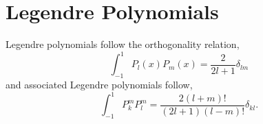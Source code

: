 \documentclass{book}
\begin{document}
\section{Legendre Polynomials}
Legendre polynomials follow the orthogonality relation,
\begin{equation}
	\int_{-1}^1 P_l(x)P_m(x) = \frac{2}{2l+1}\delta_{lm}
\end{equation}
and associated Legendre polynomials follow,
\begin{equation}
	\int_{-1}^1 P_k^mP_l^m = \frac{2(l+m)!}{(2l+1)(l-m)!}\delta_{kl}.
\end{equation}
\end{document}
